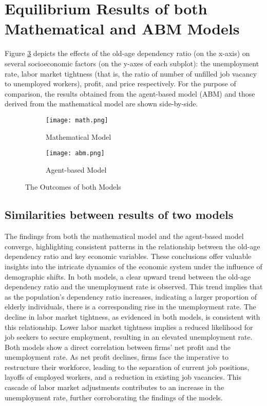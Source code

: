 \documentclass[ %
    final,
    scrbook,
    listoffigures,
    listoftables, 
    glossary]{cu-thesis}
\begin{document}
\section{Equilibrium Results of both Mathematical and ABM Models}
Figure \ref{fig:graphs} depicts the effects of the old-age dependency ratio (on the x-axis) on several socioeconomic factors (on the y-axes of each subplot):
the unemployment rate, labor market tightness (that is, the ratio of number of unfilled job vacancy to unemployed workers), profit, and price respectively. For the purpose of comparison, the results obtained from the agent-based model (ABM) and those derived from the mathematical model are shown side-by-side. 
\begin{figure}[h]
     \centering
     \begin{subfigure}{0.4\textwidth}
         \centering
         \texttt{[image: math.png]}
         \caption{Mathematical Model}
         \label{fig:math}
     \end{subfigure}
     \hfill
     \begin{subfigure}{0.4\textwidth}
         \centering
         \texttt{[image: abm.png]}
         \caption{Agent-based Model}
         \label{fig:abm}
     \end{subfigure}
     \caption{The Outcomes of both Models }
     \label{fig:graphs}
\end{figure}

\subsection{Similarities between results of two models}
The findings from both the mathematical model and the agent-based model converge, highlighting consistent patterns in the relationship between the old-age dependency ratio and key economic variables. These conclusions offer valuable insights into the intricate dynamics of the economic system under the influence of demographic shifts.
\iffalse
In both models, a clear upward trend between the old-age dependency ratio and the unemployment rate is observed. This trend implies that as the population's dependency ratio increases, indicating a larger proportion of elderly individuals, there is a corresponding rise in the unemployment rate.
The decline in labor market tightness, as evidenced in both models, is consistent with this relationship. Lower labor market tightness implies a reduced likelihood for job seekers to secure employment, resulting in an elevated unemployment rate.
Both models show a direct correlation between firms' net profit and the unemployment rate. As net profit declines, firms face the imperative to restructure their workforce, leading to the separation of current job positions, layoffs of employed workers, and a reduction in existing job vacancies. This cascade of labor market adjustments contributes to an increase in the unemployment rate, further corroborating the findings of the models.
\end{document}
